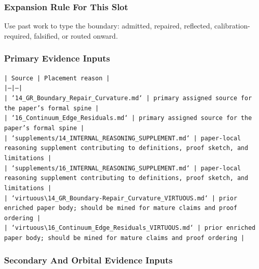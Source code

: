\documentclass[11pt]{article}
\begin{document}
\subsubsection*{Expansion Rule For This Slot}

Use past work to type the boundary: admitted, repaired, reflected, calibration-required, falsified, or routed onward.

\subsubsection*{Primary Evidence Inputs}

\noindent\texttt{| Source | Placement reason |}\\
\noindent\texttt{|---|---|}\\
\noindent\texttt{| `14\_GR\_Boundary\_Repair\_Curvature.md` | primary assigned source for the paper's formal spine |}\\
\noindent\texttt{| `16\_Continuum\_Edge\_Residuals.md` | primary assigned source for the paper's formal spine |}\\
\noindent\texttt{| `supplements/14\_INTERNAL\_REASONING\_SUPPLEMENT.md` | paper-local reasoning supplement contributing to definitions, proof sketch, and limitations |}\\
\noindent\texttt{| `supplements/16\_INTERNAL\_REASONING\_SUPPLEMENT.md` | paper-local reasoning supplement contributing to definitions, proof sketch, and limitations |}\\
\noindent\texttt{| `virtuous\textbackslash{}14\_GR\_Boundary-Repair\_Curvature\_VIRTUOUS.md` | prior enriched paper body; should be mined for mature claims and proof ordering |}\\
\noindent\texttt{| `virtuous\textbackslash{}16\_Continuum\_Edge\_Residuals\_VIRTUOUS.md` | prior enriched paper body; should be mined for mature claims and proof ordering |}\\

\subsubsection*{Secondary And Orbital Evidence Inputs}
\end{document}
